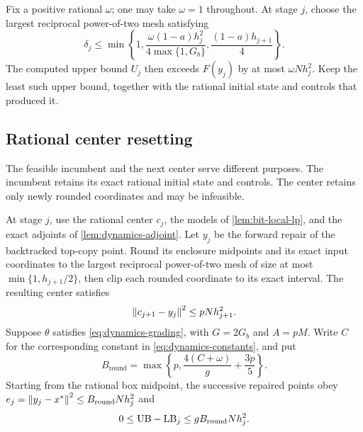 Fix a positive rational $\omega$; one may take $\omega=1$ throughout.
At stage $j$, choose the largest reciprocal power-of-two mesh satisfying
\begin{equation}
 \delta_j\le
 \min\left\{1,
       \frac{\omega(1-a)h_j^2}{4\max\{1,G_b\}},
       \frac{(1-a)h_{j+1}}4\right\}.
 \label{eq:bit-enclosure-mesh}
\end{equation}
The computed upper bound $U_j$ then exceeds $F(y_j)$ by at most
$\omega Nh_j^2$.  Keep the least such upper bound, together with the
rational initial state and controls that produced it.

\subsection{Rational center resetting}

The feasible incumbent and the next center serve different purposes.
The incumbent retains its exact rational initial state and controls.
The center retains only newly rounded coordinates and may be infeasible.

\begin{lemma}
\label{lem:bit-reset}
At stage $j$, use the rational center $c_j$, the models of
\cref{lem:bit-local-lp}, and the exact adjoints of
\cref{lem:dynamics-adjoint}.  Let $y_j$ be the forward repair of the
backtracked top-copy point.  Round its enclosure midpoints and its exact
input coordinates to the largest reciprocal power-of-two mesh of size at
most $\min\{1,h_{j+1}/2\}$, then clip
each rounded coordinate to its exact interval.  The resulting center
satisfies
\begin{equation}
 \left\lVert c_{j+1}-y_j\right\rVert^2\le pNh_{j+1}^2.
 \label{eq:bit-reset}
\end{equation}
Suppose $\theta$ satisfies \cref{eq:dynamics-grading}, with $G=2G_b$
and $A=pM$.  Write $C$ for the corresponding constant in
\cref{eq:dynamics-constants}, and put
\begin{equation}
 B_{\mathrm{round}}=\max\left\{p,
                 \frac{4(C+\omega)}g+\frac{3p}5\right\}.
 \label{eq:bit-rounded-constant}
\end{equation}
Starting from the rational box midpoint, the successive repaired points
obey $e_j=\left\lVert y_j-x^*\right\rVert^2\le B_{\mathrm{round}}Nh_j^2$ and
\begin{equation}
 0\le\mathrm{UB}-\mathrm{LB}_j\le gB_{\mathrm{round}}Nh_j^2.
 \label{eq:bit-gap}
\end{equation}
\end{lemma}

